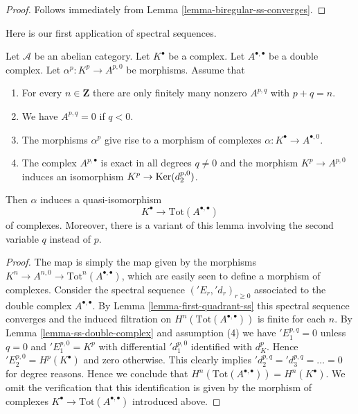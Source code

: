 \begin{proof}
Follows immediately from Lemma \ref{lemma-biregular-ss-converges}.
\end{proof}

\noindent
Here is our first application of spectral sequences.

\begin{lemma}
\label{lemma-double-complex-gives-resolution}
\begin{reference}
\cite[Chapter I, \S 4, no. 27, Proposition 1, p. 220]{FAC}
\end{reference}
Let $\mathcal{A}$ be an abelian category.
Let $K^\bullet$ be a complex.
Let $A^{\bullet, \bullet}$ be a double complex.
Let $\alpha^p : K^p \to A^{p, 0}$ be morphisms.
Assume that
\begin{enumerate}
\item For every $n \in \mathbf{Z}$ there are only finitely many nonzero
$A^{p, q}$ with $p + q = n$.
\item We have $A^{p, q} = 0$ if $q < 0$.
\item The morphisms $\alpha^p$ give rise to a morphism
of complexes $\alpha : K^\bullet \to A^{\bullet, 0}$.
\item The complex $A^{p, \bullet}$ is exact in all degrees
$q \not = 0$ and the morphism $K^p \to A^{p, 0}$ induces
an isomorphism $K^p \to \mathop{\mathrm{Ker}}(d_2^{p, 0})$.
\end{enumerate}
Then $\alpha$ induces a quasi-isomorphism
$$
K^\bullet \longrightarrow \text{Tot}(A^{\bullet, \bullet})
$$
of complexes.
Moreover, there is a variant of this lemma involving the second
variable $q$ instead of $p$.
\end{lemma}

\begin{proof}
The map is simply the map given by the morphisms
$K^n \to A^{n, 0} \to \text{Tot}^n(A^{\bullet, \bullet})$,
which are easily seen to define a morphism of complexes.
Consider the spectral sequence $({}'E_r, {}'d_r)_{r \geq 0}$
associated to the double complex $A^{\bullet, \bullet}$.
By Lemma \ref{lemma-first-quadrant-ss} this spectral sequence converges
and the induced filtration on $H^n(\text{Tot}(A^{\bullet, \bullet}))$
is finite for each $n$.
By Lemma \ref{lemma-ss-double-complex} and assumption (4) we have
${}'E_1^{p, q} = 0$ unless $q = 0$ and $'E_1^{p, 0} = K^p$
with differential ${}'d_1^{p, 0}$ identified with $d_K^p$.
Hence ${}'E_2^{p, 0} = H^p(K^\bullet)$ and zero otherwise.
This clearly implies ${}'d_2^{p, q} = {}'d_3^{p, q} = \ldots = 0$
for degree reasons. Hence we conclude that
$H^n(\text{Tot}(A^{\bullet, \bullet})) = H^n(K^\bullet)$.
We omit the verification that this identification is given by the
morphism of complexes $K^\bullet \to \text{Tot}(A^{\bullet, \bullet})$
introduced above.
\end{proof}

